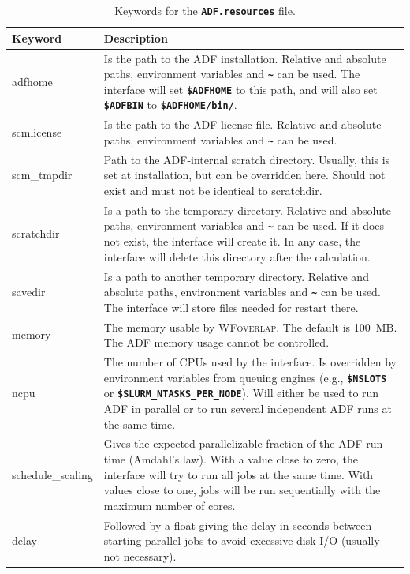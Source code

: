 \documentclass[a4paper,10pt,DIV=15,openany]{scrbook}
\newcommand{\ttt}[1]{\textbf{\texttt{#1}}}
\begin{document}
\begin{table}
  \centering
  \caption{Keywords for the \ttt{ADF.resources} file.}
  \label{tab:adf_sh2}
  \begin{tabular}{>{\ttfamily}lp{12cm}}
  \hline
  Keyword       &Description\\
  \hline
adfhome                 &Is the path to the \textsc{ADF} installation. Relative and absolute paths, environment variables and \ttt{\textasciitilde} can be used. The interface will set \ttt{\$ADFHOME} to this path, and will also set \ttt{\$ADFBIN} to \ttt{\$ADFHOME/bin/}.
\\
scmlicense              &Is the path to the \textsc{ADF} license file. Relative and absolute paths, environment variables and \ttt{\textasciitilde} can be used. 
\\
scm\_tmpdir             &Path to the ADF-internal scratch directory. Usually, this is set at installation, but can be overridden here. Should not exist and must not be identical to scratchdir.
\\
scratchdir              &Is a path to the temporary directory. Relative and absolute paths, environment variables and \ttt{\textasciitilde} can be used. If it does not exist, the interface will create it. In any case, the interface will delete this directory after the calculation.
\\
savedir                 &Is a path to another temporary directory.  Relative and absolute paths, environment variables and \ttt{\textasciitilde} can be used. The interface will store files needed for restart there.
\\
memory                  &The memory usable by \textsc{WFoverlap}. The default is 100~MB. The ADF memory usage cannot be controlled.
\\
ncpu                    &The number of CPUs used by the interface. Is overridden by environment variables from queuing engines (e.g., \ttt{\$NSLOTS} or \ttt{\$SLURM\_NTASKS\_PER\_NODE}). Will either be used to run ADF in parallel or to run several independent ADF runs at the same time.
\\
schedule\_scaling       &Gives the expected parallelizable fraction of the ADF run time (Amdahl's law). With a value close to zero, the interface will try to run all jobs at the same time. With values close to one, jobs will be run sequentially with the maximum number of cores.
\\
delay                   &Followed by a float giving the delay in seconds between starting parallel jobs to avoid excessive disk I/O (usually not necessary).

\end{tabular}
\end{table}
\end{document}
